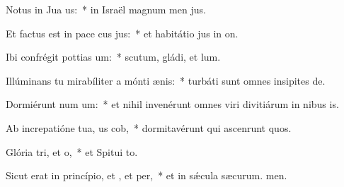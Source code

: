 \item Notus in Jua us:~* in Israël magnum men jus.
\item Et factus est in pace cus jus:~* et habitátio jus in on.
\item Ibi confrégit pottias um:~* scutum, gládi, et lum.
\item Illúminans tu mirabíliter a mónti ænis:~* turbáti sunt omnes insipites de.
\item Dormiérunt num um:~* et nihil invenérunt omnes viri divitiárum in nibus is.
\item Ab increpatióne tua, us cob,~* dormitavérunt qui ascenrunt quos.
\item Glória tri, et o,~* et Spitui to.
\item Sicut erat in princípio, et , et per,~* et in sǽcula sæcurum. men.
